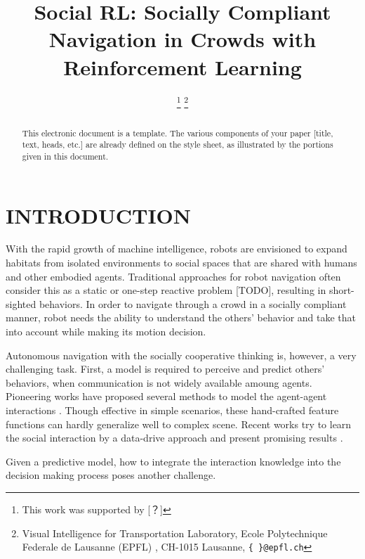 \documentclass[letterpaper, 10 pt, conference]{ieeeconf}  %
\title{\Large \bf Social RL: Socially Compliant Navigation in Crowds
with Reinforcement Learning}
\author{%
\thanks{This work was supported by [？]}%
\thanks{Visual Intelligence for Transportation Laboratory, Ecole Polytechnique Federale de Lausanne (EPFL)
, CH-1015 Lausanne,
        {\tt\small \{ \}@epfl.ch}}%
}
\begin{document}

\maketitle
\thispagestyle{empty}
\pagestyle{empty}

\begin{abstract}
This electronic document is a template. The various components of your paper [title, text, heads, etc.] are already defined on the style sheet, as illustrated by the portions given in this document.

\vspace{5cm}

\end{abstract}


\section{INTRODUCTION} \label{sec:intro}

With the rapid growth of machine intelligence, robots are envisioned to expand habitats from isolated environments to social spaces that are shared with humans and other embodied agents. Traditional approaches for robot navigation often consider this as a static or one-step reactive problem [TODO], resulting in short-sighted behaviors. In order to navigate through a crowd in a socially compliant manner, robot needs the ability to understand the others' behavior and take that into account while making its motion decision. 

Autonomous navigation with the socially cooperative thinking is, however, a very challenging task. First, a model is required to perceive and predict others' behaviors, when communication is not widely available amoung agents. Pioneering works have proposed several methods to model the agent-agent interactions \cite{helbing_social_1995}. Though effective in simple scenarios, these hand-crafted feature functions can hardly generalize well to complex scene. Recent works try to learn the social interaction by a data-drive approach and present promising results \cite{alahi_social_2016,vemula_social_2017,gupta_social_2018}. 

Given a predictive model, how to integrate the interaction knowledge into the decision making process poses another challenge. 
\end{document}
